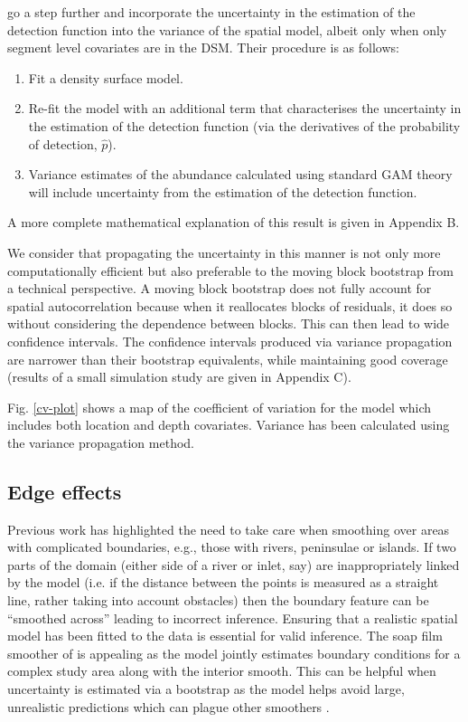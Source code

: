 \documentclass[a4paper,12pt]{article}
\begin{document}
\cite{WILLIAMS:2011in} go a step further and incorporate the uncertainty in the estimation of the detection function into the variance of the spatial model, albeit only when only segment level covariates are in the DSM. Their procedure is as follows:
\begin{enumerate}
\item Fit a density surface model.
\item Re-fit the model with an additional term that characterises the uncertainty in the estimation of the detection function (via the derivatives of the probability of detection, $\hat{p}$).
\item Variance estimates of the abundance calculated using standard GAM theory will include uncertainty from the estimation of the detection function.
\end{enumerate}
A more complete mathematical explanation of this result is given in Appendix B.

We consider that propagating the uncertainty in this manner is not only more computationally efficient but also preferable to the moving block bootstrap from a technical perspective. A moving block bootstrap does not fully account for spatial autocorrelation because when it reallocates  blocks of residuals, it does so without considering the dependence between blocks. This can then lead to wide confidence intervals. The confidence intervals produced via variance propagation are narrower than their bootstrap equivalents, while maintaining good coverage (results of a small simulation study are given in Appendix C).

Fig. \ref{cv-plot} shows a map of the coefficient of variation for the model which includes both location and depth covariates. Variance has been calculated using the variance propagation method. 

\subsection*{Edge effects}
\label{s:leakage}

Previous work \citep{Ramsay:2002uo,Wang:2007tf,Wood:2008vo,ScottHayward:2011tc,Miller:2012tm} has highlighted the need to take care when smoothing over areas with complicated boundaries, e.g., those with rivers, peninsulae or islands. If two parts of the domain (either side of a river or inlet, say) are inappropriately linked by the model (i.e. if the distance between the points is measured as a straight line, rather taking into account obstacles) then the boundary feature can be ``smoothed across'' leading to incorrect inference. Ensuring that a realistic spatial model has been fitted to the data is essential for valid inference. The soap film smoother of \cite{Wood:2008vo} is appealing as the model jointly estimates boundary conditions for a complex study area along with the interior smooth. This can be helpful when uncertainty is estimated via a bootstrap as the model helps avoid large, unrealistic predictions which can plague other smoothers \citep{Bravington:2009vo}.
\end{document}
